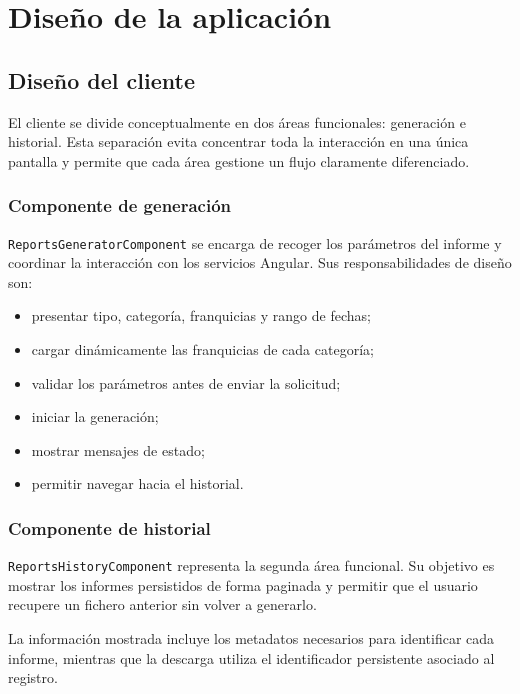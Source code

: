 \documentclass[11pt,a4paper,titlepage,oneside]{report}
\begin{document}
\section{Diseño de la aplicación}

\subsection{Diseño del cliente}

El cliente se divide conceptualmente en dos áreas funcionales: generación e
historial. Esta separación evita concentrar toda la interacción en una única
pantalla y permite que cada área gestione un flujo claramente diferenciado.

\subsubsection{Componente de generación}

\texttt{ReportsGeneratorComponent} se encarga de recoger los parámetros del
informe y coordinar la interacción con los servicios Angular. Sus
responsabilidades de diseño son:

\begin{itemize}
  \item presentar tipo, categoría, franquicias y rango de fechas;
  \item cargar dinámicamente las franquicias de cada categoría;
  \item validar los parámetros antes de enviar la solicitud;
  \item iniciar la generación;
  \item mostrar mensajes de estado;
  \item permitir navegar hacia el historial.
\end{itemize}

\subsubsection{Componente de historial}

\texttt{ReportsHistoryComponent} representa la segunda área funcional. Su
objetivo es mostrar los informes persistidos de forma paginada y permitir que
el usuario recupere un fichero anterior sin volver a generarlo.

La información mostrada incluye los metadatos necesarios para identificar cada
informe, mientras que la descarga utiliza el identificador persistente asociado
al registro.
\end{document}
